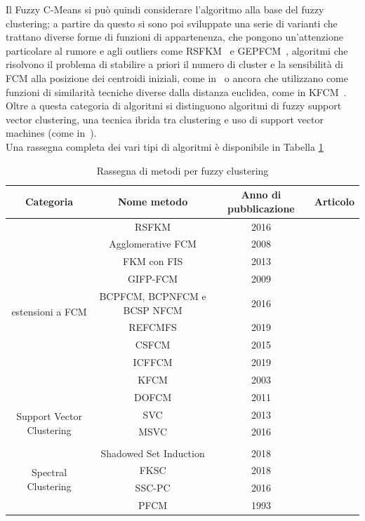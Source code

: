 \documentclass[oneside, openany]{book}
\begin{document}
		Il Fuzzy C-Means si può quindi considerare l'algoritmo alla base del fuzzy clustering; a partire da questo si sono poi sviluppate una serie di varianti che trattano diverse forme di funzioni di appartenenza, che pongono un'attenzione particolare al rumore e agli outliers come RSFKM~\cite{bib:rsfkm} e GEPFCM~\cite{bib:gifpfcm}, algoritmi che risolvono il problema di stabilire a priori il numero di cluster e la sensibilità di FCM alla posizione dei centroidi iniziali, come in~\cite{bib:afkm} o ancora che utilizzano come funzioni di similarità tecniche diverse dalla distanza euclidea, come in KFCM~\cite{bib:kfcm}.
		\\
		Oltre a questa categoria di algoritmi si distinguono algoritmi di fuzzy support vector clustering, una tecnica ibrida tra clustering e uso di support vector machines (come in~\cite{bib:svc,bib:msvc}).
		\\
		Una rassegna completa dei vari tipi di algoritmi è disponibile in Tabella \ref{tab:clustering}
		\begin{table}[h!]
			\caption{Rassegna di metodi per fuzzy clustering}
			\begin{center}\begin{tabular}{ |c|c|c|c| } 
					\hline
					Categoria & Nome metodo & Anno di pubblicazione & Articolo\\
					\hline
					\multirow{10}{4em}{estensioni a FCM} 
					& RSFKM & 2016 & \cite{bib:rsfkm}\\ 
					& Agglomerative FCM & 2008 & \cite{bib:afkm}\\
					& FKM con FIS & 2013 & \cite{bib:fkmfis}\\ 
					& GIFP-FCM & 2009 & \cite{bib:gifpfcm}\\
					& BCPFCM, BCPNFCM e BCSP NFCM & 2016 & \cite{bib:bcpfcm}\\
					& REFCMFS & 2019 & \cite{bib:refcmfs}\\ 
					& CSFCM & 2015 & \cite{bib:csfcm}\\
					& ICFFCM & 2019 &\cite{bib:icffcm}\\
					& KFCM & 2003 &\cite{bib:kfcm}\\
					& DOFCM & 2011 & \cite{bib:dofcm}\\
					\hline													
					\multirow{2}{4em}{Support Vector Clustering}	& SVC & 2013 & \cite{bib:svc}\\ 
					& MSVC & 2016 & \cite{bib:msvc}\\ 
					&  &  & \\
					\hline
					& Shadowed Set Induction & 2018 & \cite{bib:ssi} \\
					\hline
					\multirow{2}{4em}{Spectral Clustering}	& FKSC & 2018 & \cite{bib:fksc}\\ 
					& SSC-PC & 2016 & \cite{bib:sscpc}\\ 
					\hline
					& PFCM & 1993 & \cite{bib:pfcm}\\
					\hline
				\end{tabular}
			\end{center}
			\label{tab:clustering}	
		\end{table}
	
\end{document}
